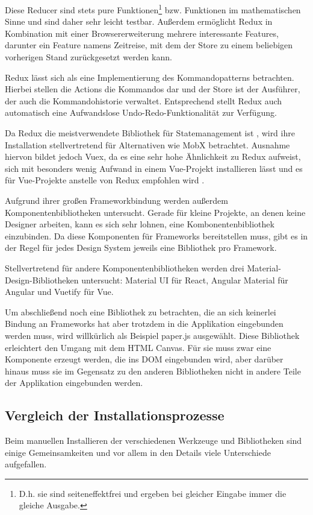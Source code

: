 Diese Reducer sind stets pure Funktionen\footnote{D.h. sie sind seiteneffektfrei und ergeben bei gleicher Eingabe immer die gleiche Ausgabe.} bzw. Funktionen im mathematischen Sinne und sind daher sehr leicht testbar. Außerdem ermöglicht Redux in Kombination mit einer Browsererweiterung mehrere interessante Features, darunter ein Feature namens \glqq Zeitreise\grqq , mit dem der Store zu einem beliebigen vorherigen Stand zurückgesetzt werden kann.

Redux lässt sich als eine Implementierung des Kommandopatterns betrachten. Hierbei stellen die Actions die Kommandos dar und der Store ist der Ausführer, der auch die Kommandohistorie verwaltet. Entsprechend stellt Redux auch automatisch eine Aufwandslose Undo-Redo-Funktionalität zur Verfügung.

Da Redux die meistverwendete Bibliothek für Statemanagement ist \cite{stateofjs}, wird ihre Installation stellvertretend für Alternativen wie MobX betrachtet. Ausnahme hiervon bildet jedoch Vuex, da es eine sehr hohe Ähnlichkeit zu Redux aufweist, sich mit besonders wenig Aufwand in einem Vue-Projekt installieren lässt und es für Vue-Projekte anstelle von Redux empfohlen wird \cite{vuejs_docs:redux_vs_vuex}.

Aufgrund ihrer großen Frameworkbindung werden außerdem Komponentenbibliotheken untersucht. Gerade für kleine Projekte, an denen keine Designer arbeiten, kann es sich sehr lohnen, eine Kombonentenbibliothek einzubinden. Da diese Komponenten für Frameworks bereitstellen muss, gibt es in der Regel für jedes Design System jeweils eine Bibliothek pro Framework.

Stellvertretend für andere Komponentenbibliotheken werden drei Material-Design-Bibliotheken untersucht: Material UI für React, Angular Material für Angular und Vuetify für Vue.

Um abschließend noch eine Bibliothek zu betrachten, die an sich keinerlei Bindung an Frameworks hat aber trotzdem in die Applikation eingebunden werden muss, wird willkürlich als Beispiel paper.js ausgewählt. Diese Bibliothek erleichtert den Umgang mit dem HTML Canvas. Für sie muss zwar eine Komponente erzeugt werden, die ins \gls{DOM} eingebunden wird, aber darüber hinaus muss sie im Gegensatz zu den anderen Bibliotheken nicht in andere Teile der Applikation eingebunden werden.

\subsection{Vergleich der Installationsprozesse}
Beim manuellen Installieren der verschiedenen Werkzeuge und Bibliotheken sind einige Gemeinsamkeiten und vor allem in den Details viele Unterschiede aufgefallen.

